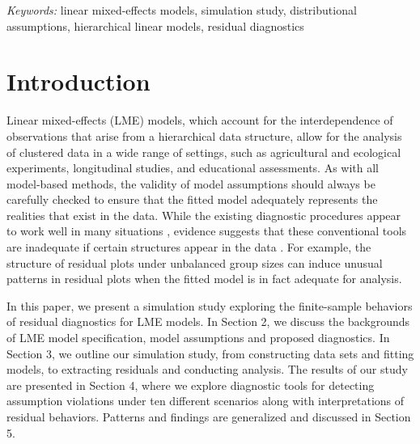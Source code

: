 \documentclass[12pt]{article}
\begin{document}
\noindent%
{\it Keywords:} linear mixed-effects models, simulation study,
distributional assumptions, hierarchical linear models, residual
diagnostics
\vfill

\newpage
{} %

\onehalfspacing

\section{Introduction}

Linear mixed-effects (LME) models, which account for the interdependence
of observations that arise from a hierarchical data structure, allow for
the analysis of clustered data in a wide range of settings, such as
agricultural and ecological experiments, longitudinal studies, and
educational assessments. As with all model-based methods, the validity
of model assumptions should always be carefully checked to ensure that
the fitted model adequately represents the realities that exist in the
data. While the existing diagnostic procedures \citep{Singer2017-sd}
appear to work well in many situations \citep{Schutzenmeister2012},
evidence suggests that these conventional tools are inadequate if
certain structures appear in the data \citep{Loy2015-vl}. For example,
the structure of residual plots under unbalanced group sizes can induce
unusual patterns in residual plots when the fitted model is in fact
adequate for analysis\citep{Morrell2000-ut}.

In this paper, we present a simulation study exploring the finite-sample
behaviors of residual diagnostics for LME models. In Section 2, we
discuss the backgrounds of LME model specification, model assumptions
and proposed diagnostics. In Section 3, we outline our simulation study,
from constructing data sets and fitting models, to extracting residuals
and conducting analysis. The results of our study are presented in
Section 4, where we explore diagnostic tools for detecting assumption
violations under ten different scenarios along with interpretations of
residual behaviors. Patterns and findings are generalized and discussed
in Section 5.
\end{document}
